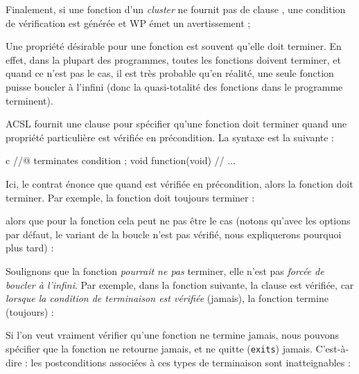 Finalement, si une fonction d'un \textit{cluster} ne fournit pas de clause
, une condition de vérification
 est générée et WP émet un avertissement ;








Une propriété désirable pour une fonction est souvent qu'elle doit terminer.
En effet, dans la plupart des programmes, toutes les fonctions doivent terminer,
et quand ce n'est pas le cas, il est très probable qu'en réalité, une seule
fonction puisse boucler à l'infini (donc la quasi-totalité des fonctions dans le
programme terminent).




ACSL fournit une clause  pour spécifier qu'une fonction
doit terminer quand une propriété particulière est vérifiée en précondition. La
syntaxe est la suivante :


\begin{CodeBlock}{c}
//@ terminates condition ;
void function(void){
  // ...
}
\end{CodeBlock}


Ici, le contrat énonce que quand  est vérifiée en
précondition, alors la fonction doit terminer. Par exemple, la fonction
 doit toujours terminer :




alors que pour la fonction  cela peut ne pas être le cas
(notons qu'avec les options par défaut, le variant de la boucle n'est pas
vérifié, nous expliquerons pourquoi plus tard) :




Soulignons que la fonction \textit{pourrait ne pas} terminer, elle n'est pas
\textit{forcée de boucler à l'infini}. Par exemple, dans la fonction suivante,
la clause  est vérifiée, car
\textit{lorsque la condition de terminaison est vérifiée} (jamais), la fonction
termine (toujours) :




\begin{Information}
  Si l'on veut vraiment vérifier qu'une fonction ne termine jamais, nous pouvons
  spécifier que la fonction ne retourne jamais, et ne quitte (\texttt{exits})
  jamais. C'est-à-dire : les postconditions associées à ces types de terminaison
  sont inatteignables :

\end{Information}


